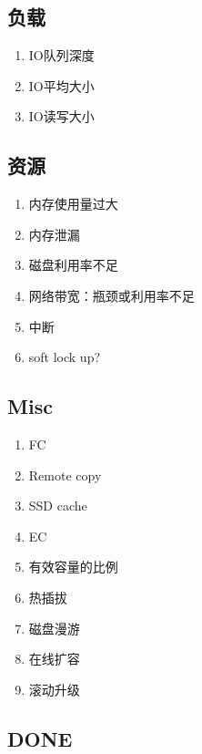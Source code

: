 \documentclass[UTF8]{ctexart}
\begin{document}
\subsection{负载}

\begin{tcolorbox}
\begin{enumerate}
    \item IO队列深度
    \item IO平均大小
    \item IO读写大小
\end{enumerate}
\end{tcolorbox}

\subsection{资源}

\begin{tcolorbox}
\begin{enumerate}
    \item 内存使用量过大
    \item 内存泄漏
    \item 磁盘利用率不足
    \item 网络带宽：瓶颈或利用率不足
    \item 中断
    \item soft lock up?
\end{enumerate}
\end{tcolorbox}

\subsection{Misc}

\begin{tcolorbox}
\begin{enumerate}
    \item FC
    \item Remote copy
    \item SSD cache
    \item EC
    \item 有效容量的比例
    \item 热插拔
    \item 磁盘漫游
    \item 在线扩容
    \item 滚动升级
\end{enumerate}
\end{tcolorbox}

\subsection{DONE}
\end{document}
